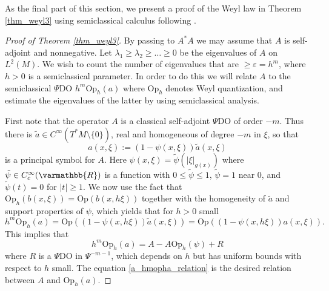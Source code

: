\documentclass[12pt,twoside]{amsart}
\numberwithin{equation}{section}
\renewcommand{\leq}{\leqslant}
\renewcommand{\geq}{\geqslant}
\renewcommand{\mathbb}{\varmathbb}
\newcommand {\R} {\mathbb{R}} \newcommand {\Z} {\mathbb{Z}}
\newcommand{\abs}[1]{\lvert #1 \rvert}          %
\newcommand{\eps}{\varepsilon}
\begin{document}
\begin{appendix}
As the final part of this section, we present a proof of the Weyl law in Theorem \ref{thm_weyl3} using semiclassical calculus following \cite[Section 14.3]{Zworski}. 

\begin{proof}[Proof of Theorem \ref{thm_weyl3}]
By passing to $A^* A$ we may assume that $A$ is self-adjoint and nonnegative. Let $\lambda_1 \geq \lambda_2 \geq \ldots \geq 0$ be the eigenvalues of $A$ on $L^2(M)$. We wish to count the number of eigenvalues that are $\geq \eps = h^m$, where $h > 0$ is a semiclassical parameter. In order to do this we will relate $A$ to the semiclassical $\Psi$DO $h^m \mathrm{Op}_h(a)$ where $\mathrm{Op}_h$ denotes Weyl quantization, and estimate the eigenvalues of the latter by using semiclassical analysis.

First note that the operator $A$ is a classical self-adjoint $\Psi$DO of order $-m$. Thus there is $\tilde{a} \in C^{\infty}(T^* M \setminus \{0\})$, real and homogeneous of degree $-m$ in $\xi$,  so that 
\[
a(x,\xi) := (1-\psi(x,\xi)) \tilde{a}(x,\xi)
\]
is a principal symbol for $A$. Here $\psi(x,\xi) = \tilde{\psi}(\abs{\xi}_{g(x)})$ where $\tilde{\psi} \in C^{\infty}_c(\R)$ is a function with $0 \leq \tilde{\psi} \leq 1$, $\tilde{\psi} = 1$ near $0$, and $\tilde{\psi}(t) = 0$ for $\abs{t} \geq 1$. We now use the fact that $\mathrm{Op}_h(b(x,\xi)) = \mathrm{Op}(b(x, h\xi))$ together with the homogeneity of $\tilde{a}$ and support properties of $\psi$, which yields that for $h > 0$ small 
\[
h^m \mathrm{Op}_h(a) = \mathrm{Op}((1-\psi(x,h\xi)) \tilde{a}(x,\xi)) = \mathrm{Op}((1-\psi(x,h\xi))a(x,\xi)).
\]
This implies that 
\begin{equation} \label{a_hmopha_relation}
h^m \mathrm{Op}_h(a) = A - A \mathrm{Op}_h(\psi) + R
\end{equation}
where $R$ is a $\Psi$DO in $\Psi^{-m-1}$, which depends on $h$ but has uniform bounds with respect to $h$ small. The equation \eqref{a_hmopha_relation} is the desired relation between $A$ and $\mathrm{Op}_h(a)$.


\end{proof}
\end{appendix}
\end{document}
